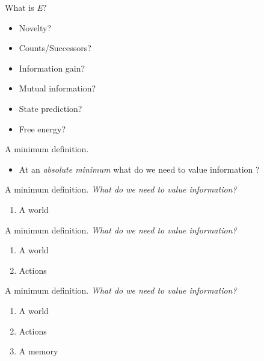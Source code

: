 \documentclass[10pt]{beamer}
\begin{document}
\begin{frame}[fragile]{What is \textit{E}?}
\begin{itemize}
    \item Novelty?
    \item Counts/Successors?
    \item Information gain?
    \item Mutual information?
    \item State prediction?
    \item \alert{Free energy?}
\end{itemize}
\end{frame}

\begin{frame}[fragile]{A minimum definition.}
\begin{itemize}
    \item At an \textit{absolute minimum} what do we need to value information ?
\end{itemize}
\end{frame}

\begin{frame}[fragile]{A minimum definition.}
\textit{What do we need to value information?}
\begin{enumerate}
    \item A world
\end{enumerate}
\end{frame}

\begin{frame}[fragile]{A minimum definition.}
\textit{What do we need to value information?}
\begin{enumerate}
    \item A world
    \item Actions
\end{enumerate}
\end{frame}

\begin{frame}[fragile]{A minimum definition.}
\textit{What do we need to value information?}
\begin{enumerate}
    \item A world
    \item Actions
    \item A memory
\end{enumerate}
\end{frame}
\end{document}
